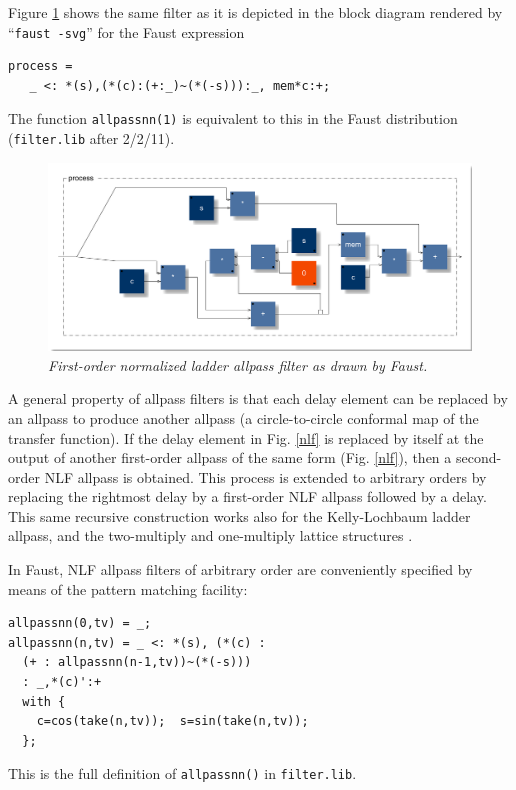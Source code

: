 \documentclass[twoside,a4paper]{article}
\begin{document}
Figure \ref{nlf1} shows the same filter as it is depicted in the block diagram
rendered by ``\texttt{faust -svg}'' for the Faust expression
\begin{verbatim}
process = 
   _ <: *(s),(*(c):(+:_)~(*(-s))):_, mem*c:+;
\end{verbatim}
The function \texttt{allpassnn(1)} is equivalent to this in the Faust
distribution (\texttt{filter.lib} after 2/2/11).

\begin{figure}[ht]
\centerline{\includegraphics[scale=0.33]{fig/nlf1.pdf}}
\caption{\label{nlf1}{\it First-order normalized ladder allpass filter as drawn by Faust.}}
\end{figure}

A general property of allpass filters is that each delay element can
be replaced by an allpass to produce another allpass (a
circle-to-circle conformal map of the transfer function).  If the
delay element in Fig.{} \ref{nlf} is replaced by itself at the output
of another first-order allpass of the same form (Fig.{} \ref{nlf}),
then a second-order NLF allpass is obtained.  This process is extended
to arbitrary orders by replacing the rightmost delay by a first-order
NLF allpass followed by a delay.  This same recursive construction
works also for the Kelly-Lochbaum ladder allpass, and the
two-multiply and one-multiply lattice structures \cite{MG,PASP}.

In Faust, NLF allpass filters of arbitrary order are conveniently
specified by means of the pattern matching facility:
\begin{samepage}
\begin{verbatim}
allpassnn(0,tv) = _;
allpassnn(n,tv) = _ <: *(s), (*(c) : 
  (+ : allpassnn(n-1,tv))~(*(-s))) 
  : _,*(c)':+
  with { 
    c=cos(take(n,tv));  s=sin(take(n,tv)); 
  };
\end{verbatim}
\end{samepage}
This is the full definition of \texttt{allpassnn()} in 
\texttt{filter.lib}.
\end{document}
